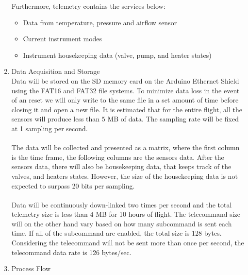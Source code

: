 \begin{enumerate}[label=(\alph*)]
Furthermore, telemetry contains the services below:
\begin{itemize}
    \item Data from temperature, pressure and airflow sensor
    \item Current instrument modes
    \item Instrument housekeeping data (valve, pump, and heater states)
\end{itemize}
\item{Data Acquisition and Storage}\\
Data will be stored on the SD memory card on the Arduino Ethernet Shield using the FAT16 and FAT32 file systems. To minimize data loss in the event of an reset we will only write to the same file in a set amount of time before closing it and open a new file. It is estimated that for the entire flight, all the sensors will produce less than $5$ MB of data. The sampling rate will be fixed at 1 sampling per second.\\
\\
The data will be collected and presented as a matrix, where the first column is the time frame, the following columns are the sensors data. After the sensors data, there will also be housekeeping data, that keeps track of the valves, and heaters states. However, the size of the housekeeping data is not expected to surpass 20 bits per sampling.\\
\\
Data will be continuously down-linked two times per second and the total telemetry size is less than $4$ MB for 10 hours of flight. The telecommand size will on the other hand vary based on how many subcommand is sent each time. If all of the subcommand are enabled, the total size is 128 bytes. Considering the telecommand will not be sent more than once per second, the telecommand data rate is 126 bytes/sec.
\item{Process Flow}\\

\end{enumerate}
